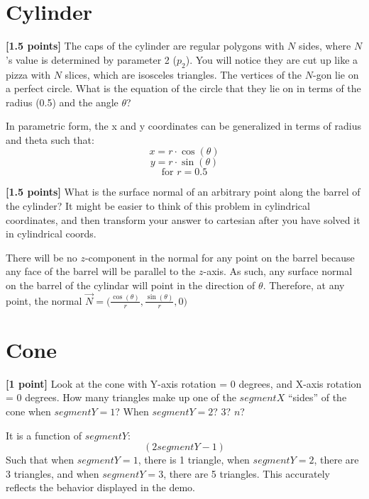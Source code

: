 \documentclass[10pt,twocolumn]{article}
\begin{document}
\section{Cylinder}
{\bf [1.5 points]} The caps of the cylinder are regular polygons with $N$ sides, where $N$'s value is determined by parameter 2 ($p_2$). You will notice they are cut up like a pizza with $N$ slices, which are isosceles triangles. The vertices of the $N$-gon lie on a perfect circle. What is the equation of the circle that they lie on  in terms of the radius (0.5) and the angle $\theta$?
\begin{framed}
In parametric form, the x and y coordinates can be generalized in terms of radius and theta such that:
\[x = r \cdot \cos(\theta)\]
\[y= r \cdot \sin(\theta)\]
\[\textrm{for } r = 0.5\]
\end{framed}

{\bf [1.5 points]} What is the surface normal of an arbitrary point along the barrel of the cylinder? It might be easier to think of this problem in cylindrical coordinates, and then transform your answer to cartesian after you have solved it in cylindrical coords.
\begin{framed}
There will be no $z$-component in the normal for any point on the barrel because any face of the barrel will be parallel to the $z$-axis.
As such, any surface normal on the barrel of the cylindar will point in the direction of $\theta$.
Therefore, at any point, the normal $\vec{N}= \Big(\frac{\cos(\theta)}{r}, \frac{\sin(\theta)}{r}, 0\Big)$
\end{framed}


\section{Cone}
{\bf [1 point]} Look at the cone with Y-axis rotation = 0 degrees, and X-axis rotation = 0 degrees. How many triangles make up one of the $segmentX$ ``sides'' of the cone when $segmentY=1$? When $segmentY=2$? 3? $n$?
\begin{framed}
It is a function of $segmentY$:
\[(2segmentY - 1)\]
Such that when $segmentY = 1$, there is 1 triangle, when $segmentY = 2$, there are 3 triangles, and when $segmentY = 3$, there are 5 triangles. This accurately reflects the behavior displayed in the demo.
\end{framed}
\end{document}
